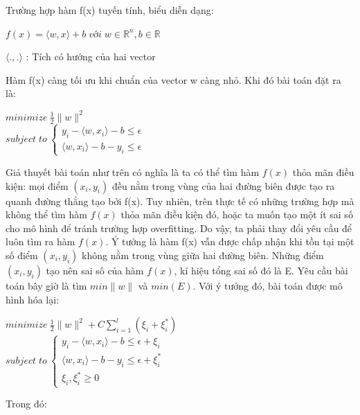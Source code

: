 \documentclass[12pt]{extarticle}
\begin{document}
				\par Trường hợp hàm f(x) tuyến tính, biểu diễn dạng:
					\begin{center}
						$f(x)=\langle w,x\rangle + b \;với \;w\in \mathbb{R}^{n}, b\in \mathbb{R}$
						\par $\langle .,.\rangle$ : Tích có hướng của hai vector
					\end{center}
				\par Hàm f(x) càng tối ưu khi chuẩn của vector w càng nhỏ. Khi đó bài toán đặt ra là:
					\begin{center}
						$minimize \: \frac{1}{2}\parallel{w}\parallel^{2}$ \\
						$subject\; to \: \begin{cases}y_{i}-\langle w,x_{i}\rangle-b \leq \epsilon \\\langle w,x_{i}\rangle-b-y_{i} \leq \epsilon\end{cases}$
					\end{center}
				\par Giả thuyết bài toán như trên có nghĩa là ta có thể tìm hàm $f(x)$ thỏa mãn điều kiện: mọi điểm $(x_{i},y_{i})$ đều nằm trong vùng của hai đường biên được tạo ra quanh đường thằng tạo bởi f(x). Tuy nhiên, trên thực tế có những trường hợp mà không thể tìm hàm $f(x)$ thỏa mãn điều kiện đó, hoặc ta muốn tạo một ít sai số cho mô hình để tránh trường hợp overfitting. Do vậy, ta phải thay đổi yêu cầu để luôn tìm ra hàm $f(x)$. Ý tưởng là hàm f(x) vẫn được chấp nhận khi tồn tại một số điểm $(x_{i},y_{i})$ không nằm trong vùng giữa hai đường biên. Những điểm $(x_{i},y_{i})$ tạo nên sai số của hàm $f(x)$, kí hiệu tổng sai số đó là E. Yêu cầu bài toán bây giờ là tìm $min \parallel w\parallel$ và $min(E)$. Với ý tưởng đó, bài toán được mô hình hóa lại:
					\begin{center}
						$minimize \: \frac{1}{2}\parallel{w}\parallel^{2} +C\sum_{i=1}^l(\xi_{i}+\xi_i^*)$ \\
						$subject\; to \: \begin{cases}y_{i}-\langle w,x_{i}\rangle-b \leq \epsilon + \xi_{i}\\\langle w,x_{i}\rangle-b-y_{i} \leq \epsilon+\xi_i^* \\ \xi_{i},\xi_i^* \geq0\end{cases}$
					\end{center}
				\par Trong đó:
\end{document}
